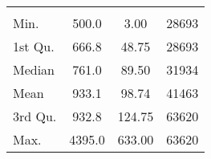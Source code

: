 \begin{tabular}{lS[table-format=5.1]S[table-format=5.1]S[table-format=5.1]}
&  &  &  \\
 Min.    & 500.0 & 3.00 & 28693 \\
 1st Qu. & 666.8 & 48.75 & 28693 \\
 Median  & 761.0 & 89.50 & 31934 \\
 Mean    & 933.1 & 98.74 & 41463 \\
 3rd Qu. & 932.8 & 124.75 & 63620 \\
 Max.    & 4395.0 & 633.00 & 63620 \\
\end{tabular}
